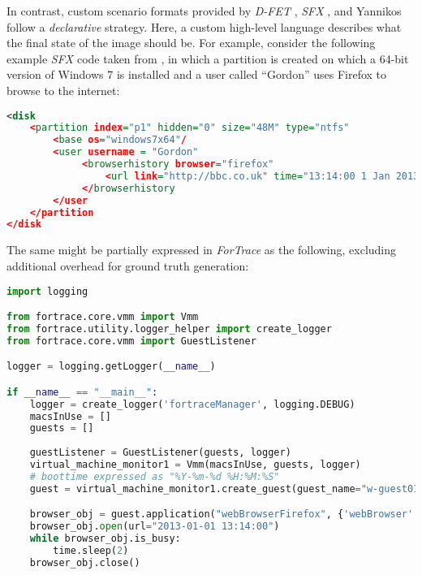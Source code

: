 \documentclass[letterpaper,12pt]{report}
\begin{document}
In contrast, custom scenario formats provided by \emph{D-FET}
\cite{williamCloudbasedDigitalForensics2011}, \emph{SFX}
\cite{russellForensicImageDescription2012}, and Yannikos
\cite{yannikosDataCorporaDigital2014} follow a \emph{declarative}
strategy. Here, a custom high-level language describes what the final
state of the image should be. For example, consider the following
example \emph{SFX} code taken from
\cite{russellForensicImageDescription2012}, in which a partition is
created on which a 64-bit version of Windows 7 is installed and a user
called ``Gordon'' uses Firefox to browse to the internet:

\begin{lstlisting}[language=XML]
<disk
    <partition index="p1" hidden="0" size="48M" type="ntfs"
        <base os="windows7x64"/
        <user username = "Gordon"
             <browserhistory browser="firefox"
                 <url link="http://bbc.co.uk" time="13:14:00 1 Jan 2013"/
             </browserhistory
        </user
    </partition
</disk
\end{lstlisting}

The same might be partially expressed in \emph{ForTrace} as the
following, excluding additional overhead for ground truth generation:

\begin{lstlisting}[language=Python]
import logging

from fortrace.core.vmm import Vmm
from fortrace.utility.logger_helper import create_logger
from fortrace.core.vmm import GuestListener

logger = logging.getLogger(__name__)

if __name__ == "__main__":
    logger = create_logger('fortraceManager', logging.DEBUG)
    macsInUse = []
    guests = []
    
    guestListener = GuestListener(guests, logger)
    virtual_machine_monitor1 = Vmm(macsInUse, guests, logger)
    # boottime expressed as "%Y-%m-%d %H:%M:%S"
    guest = virtual_machine_monitor1.create_guest(guest_name="w-guest01", platform="windows", boottime="2013-01-01 13:14:00")

    browser_obj = guest.application("webBrowserFirefox", {'webBrowser': "firefox"})
    browser_obj.open(url="2013-01-01 13:14:00")
    while browser_obj.is_busy:
        time.sleep(2)
    browser_obj.close()
    
\end{lstlisting}
\end{document}

